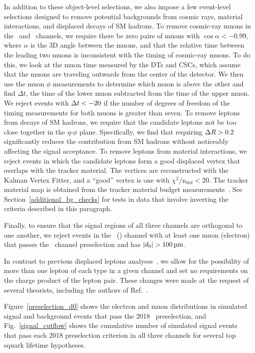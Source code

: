In addition to these object-level selections, we also impose a few event-level selections designed to remove potential backgrounds from cosmic rays, material interactions, and displaced decays of SM hadrons. To remove cosmic-ray muons in the \Pgm\Pgm\ and \Pe\Pgm\ channels, we require there be zero pairs of muons with $\cos{\alpha}<-0.99$, where $\alpha$ is the 3D angle between the muons, and that the relative time between the leading two muons is inconsistent with the timing of cosmic-ray muons. To do this, we look at the muon time measured by the DTs and CSCs, which assume that the muons are traveling outwards from the center of the detector. We then use the muon $\phi$ measurements to determine which muon is above the other and find $\Delta t$, the time of the lower muon subtracted from the time of the upper muon. We reject events with $\Delta t< -20\ns$ if the number of degrees of freedom of the timing measurements for both muons is greater than seven. To remove leptons from decays of SM hadrons, we require that the candidate leptons not be too close together in the $\eta$-$\phi$ plane. Specifically, we find that requiring $\Delta R>0.2$ significantly reduces the contribution from SM hadrons without noticeably affecting the signal acceptance. To remove leptons from material interactions, we reject events in which the candidate leptons form a good displaced vertex that overlaps with the tracker material. The vertices are reconstructed with the Kalman Vertex Fitter, and a ``good'' vertex is one with $\chi^{2}/\mathrm{n_{dof}}< 20$. The tracker material map is obtained from the tracker material budget measurements~\cite{Sirunyan:2018icq,CMS-DP-2019-001}. See Section~\ref{additional_bg_checks} for tests in data that involve inverting the criteria described in this paragraph. 

Finally, to ensure that the signal regions of all three channels are orthogonal to one another, we reject events in the \Pe\Pe\ (\Pgm\Pgm) channel with at least one muon (electron) that passes the \Pe\Pgm\ channel preselection and has $\ad>\SI{100}{\um}$.

In contrast to previous displaced leptons analyses~\cite{displaced_leptons_run1, displaced_leptons_bing}, we allow for the possibility of more than one lepton of each type in a given channel and set no requirements on the charge product of the lepton pair. These changes were made at the request of several theorists, including the authors of Ref.~\cite{Evans:2016zau}.

Figure~\ref{preselection_d0} shows the electron and muon \ad distributions in simulated signal and background events that pass the 2018 \Pe\Pgm\ preselection, and Fig.~\ref{signal_cutflow} shows the cumulative number of simulated signal events that pass each 2018 preselection criterion in all three channels for several top squark lifetime hypotheses.

